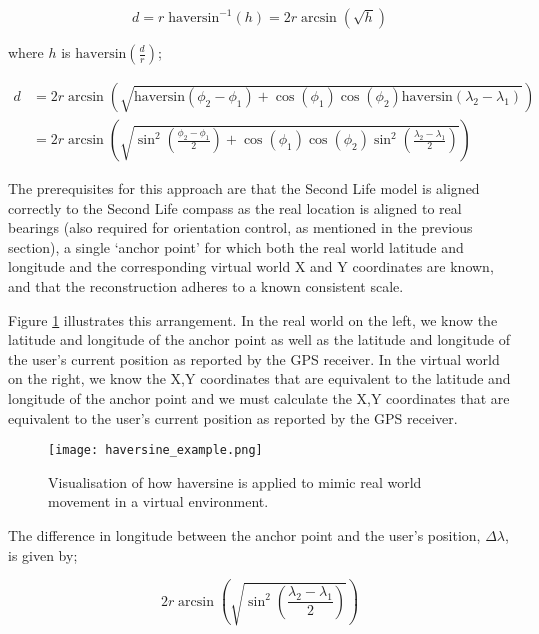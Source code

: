 \begin{equation}
	\label{haversine3}
	d = r\;\text{haversin}^{-1}\left( h \right) = 2r \arcsin \left( \sqrt{h} \right)
\end{equation}

where $h$ is $\text{haversin}\left( \frac{d}{r} \right)$;

\begin{align}
d & = 2r \arcsin\left( \sqrt{\text{haversin} \left( \phi_{2} - \phi_{1} \right) + \cos \left( \phi_{1} \right) \cos  \left( \phi_{2} \right) \text{haversin} \left( \lambda_{2} - \lambda_{1} \right) } \right) \nonumber \\ 
& = 2r \arcsin\left( \sqrt{\sin^{2} \left( \frac{\phi_{2} - \phi_{1}}{2}\right) + \cos\left( \phi_{1} \right) \cos\left( \phi_{2} \right) \sin^{2} \left( \frac{\lambda_{2} - \lambda_{1}}{2} \right) } \right)
\end{align}

The prerequisites for this approach are that the Second Life model is aligned correctly to the Second Life compass as the real location is aligned to real bearings (also required for orientation control, as mentioned in the previous section), a single `anchor point' for which both the real world latitude and longitude and the corresponding virtual world X and Y coordinates are known, and that the reconstruction adheres to a known consistent scale.

Figure \ref{haversine_example.png} illustrates this arrangement. In the real world on the left, we know the latitude and longitude of the anchor point as well as the latitude and longitude of the user's current position as reported by the GPS receiver. In the virtual world on the right, we know the X,Y coordinates that are equivalent to the latitude and longitude of the anchor point and we must calculate the X,Y coordinates that are equivalent to the user's current position as reported by the GPS receiver.

\begin{figure}[h]
\centering
  \texttt{[image: haversine\_example.png]}
  \caption{Visualisation of how haversine is applied to mimic real world movement in a virtual environment.}
  \label{haversine_example.png}
\end{figure}

The difference in longitude between the anchor point and the user's position, $\Delta\lambda$, is given by;

\begin{equation}
2r \arcsin\left( \sqrt{\sin^{2} \left( \frac{\lambda_{2} - \lambda_{1}}{2} \right) } \right)
\end{equation}

